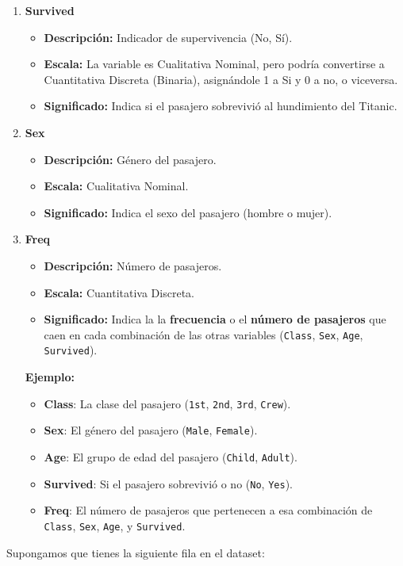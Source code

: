 \documentclass{article}
\begin{document}
\begin{enumerate}
    \item \textbf{Survived}

    \begin{itemize}
        \item \textbf{Descripción:} Indicador de supervivencia (No, Sí).
        \item \textbf{Escala:} La variable es Cualitativa Nominal, pero podría convertirse a Cuantitativa Discreta (Binaria), asignándole 1 a Si y 0 a no, o viceversa.
        \item \textbf{Significado:} Indica si el pasajero sobrevivió al hundimiento del Titanic.
    \end{itemize}

    \item \textbf{Sex}
    
    \begin{itemize}
        \item \textbf{Descripción:} Género del pasajero.
        \item \textbf{Escala:} Cualitativa Nominal.
        \item \textbf{Significado:} Indica el sexo del pasajero (hombre o mujer).
    \end{itemize}

    \item \textbf{Freq}
    
    \begin{itemize}
    \item \textbf{Descripción:} Número de pasajeros.
    \item \textbf{Escala:} Cuantitativa Discreta.
    \item \textbf{Significado:} Indica la la \textbf{frecuencia} o el \textbf{número de pasajeros} que caen en cada combinación de las otras variables (\texttt{Class}, \texttt{Sex}, \texttt{Age}, \texttt{Survived}).
    \end{itemize}    
    
    \textbf{Ejemplo:}    
    \begin{itemize}
        \item \textbf{Class}: La clase del pasajero (\texttt{1st}, \texttt{2nd}, \texttt{3rd}, \texttt{Crew}).
        \item \textbf{Sex}: El género del pasajero (\texttt{Male}, \texttt{Female}).
        \item \textbf{Age}: El grupo de edad del pasajero (\texttt{Child}, \texttt{Adult}).
        \item \textbf{Survived}: Si el pasajero sobrevivió o no (\texttt{No}, \texttt{Yes}).
        \item \textbf{Freq}: El número de pasajeros que pertenecen a esa combinación de \texttt{Class}, \texttt{Sex}, \texttt{Age}, y \texttt{Survived}.
    \end{itemize}
    
\end{enumerate}
    Supongamos que tienes la siguiente fila en el dataset:
    
\end{document}
